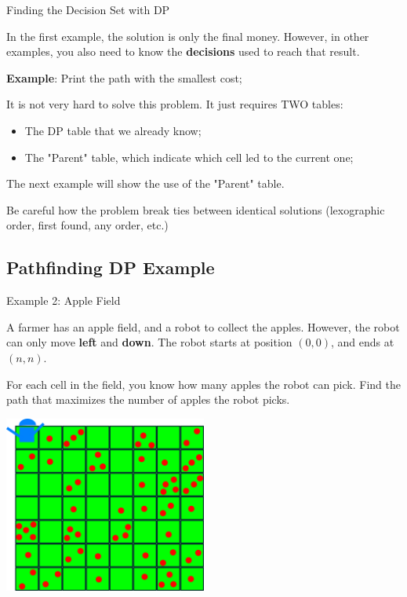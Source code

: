 \begin{frame}{Finding the Decision Set with DP}

  \begin{block}{}
    In the first example, the solution is only the final money. However, in other examples, you also need to know the {\bf decisions} used to reach that result.\bigskip

    {\bf Example}: Print the path with the smallest cost;
  \end{block}
  \bigskip

  It is not very hard to solve this problem. It just requires TWO tables:
  \begin{itemize}
    \item The DP table that we already know;
    \item The "Parent" table, which indicate which cell led to the current one;
  \end{itemize}
  \bigskip

  The next example will show the use of the "Parent" table.\bigskip

  Be careful how the problem break ties between identical solutions (lexographic order, first found, any order, etc.)
\end{frame}

\subsection{Pathfinding DP Example}
\begin{frame}{Example 2: Apple Field}
  \begin{block}{}
  {\smaller
  A farmer has an apple field, and a robot to collect the apples. However, the robot can only move {\bf left} and {\bf down}. The robot starts at position $(0,0)$, and ends at $(n,n)$.\medskip

  For each cell in the field, you know how many apples the robot can pick. Find the path that maximizes the number of apples the robot picks.
}
  \end{block}

  \begin{center}
    \includegraphics[width=0.5\textwidth]{../img/applefield}
  \end{center}
\end{frame}

